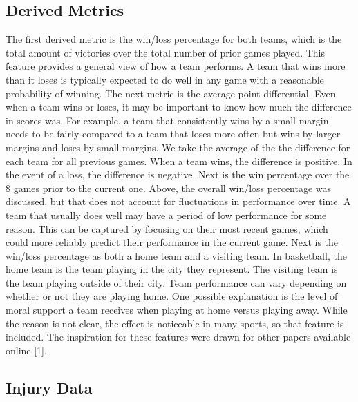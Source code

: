 \documentclass{article}
\begin{document}
\subsection{Derived Metrics}

The first derived metric is the win/loss percentage for both teams, which is the total amount of victories over the total number of prior games played. This feature provides a general view of how a team performs. A team that wins more than it loses is typically expected to do well in any game with a reasonable probability of winning. The next metric is the average point differential. Even when a team wins or loses, it may be important to know how much the difference in scores was. For example, a team that consistently wins by a small margin needs to be fairly compared to a team that loses more often but wins by larger margins and loses by small margins. We take the average of the the difference for each team for all previous games. When a team wins, the difference is positive. In the event of a loss, the difference is negative. Next is the win percentage over the 8 games prior to the current one. Above, the overall win/loss percentage was discussed, but that does not account for fluctuations in performance over time. A team that usually does well may have a period of low performance for some reason. This can be captured by focusing on their most recent games, which could more reliably predict their performance in the current game. Next is the win/loss percentage as both a home team and a visiting team. In basketball, the home team is the team playing in the city they represent. The visiting team is the team playing outside of their city. Team performance can vary depending on whether or not they are playing home. One possible explanation is the level of moral support a team receives when playing at home versus playing away. While the reason is not clear, the effect is noticeable in many sports, so that feature is included. The inspiration for these features were drawn for other papers available online [1]. 

\subsection {Injury Data}
\end{document}
